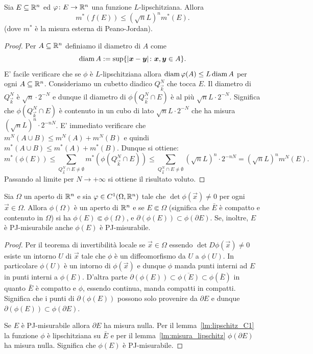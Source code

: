 \begin{lemma}
  \label{lm:misura_lipschitz}
Sia $E\subseteq {\mathbb R}^n$ ed $\varphi\colon E \to {\mathbb R}^n$ 
una funzione $L$-lipschitziana.
Allora 
\[
  m^*(f(E)) \le (\sqrt n L)^n m^*(E).
\]
(dove $m^*$ è la misura esterna di Peano-Jordan).
\end{lemma}
\begin{proof}
Per $A\subseteq {\mathbb R}^n$ definiamo il diametro di $A$ come
\[
 \operatorname{diam} A := \sup\{{\left|\boldsymbol x - \boldsymbol y\right|}\colon \boldsymbol x, \boldsymbol y \in A\}.
\]
E' facile verificare che se $\phi$ è $L$-lipschitziana allora
$\operatorname{diam} \varphi(A) \le L \operatorname{diam} A$ per ogni $A\subseteq {\mathbb R}^n$.
Consideriamo un cubetto diadico $Q^N_{\vec k}$ che tocca $E$.
Il diametro di $Q^N_{\vec k}$ è $\sqrt n \cdot 2^{-N}$ e dunque 
il diametro di $\phi(Q^N_{\vec k}\cap E)$ è al più $\sqrt n L \cdot 2^{-N}$.
Significa che $\phi(Q^N_{\vec k}\cap E)$ è contenuto 
in un cubo di lato $\sqrt n L \cdot 2^{-N}$ 
che ha misura $(\sqrt n L)^n \cdot 2^{-nN}$.
E' immediato verificare che $m^N(A\cup B)\le m^N(A) + m^N(B)$ 
e quindi $m^*(A\cup B)\le m^*(A) + m^*(B)$.
Dunque si ottiene:
\[
  m^*(\phi(E)) \le \sum_{Q^N_{\vec k}\cap E \neq \emptyset} m^*(\phi(Q^N_{\vec k}\cap E))
  \le \sum_{Q^N_{\vec k}\cap E \neq \emptyset} (\sqrt n L)^n \cdot 2^{-nN}
  = (\sqrt n L)^n m^N(E).
\]
Passando al limite per $N\to +\infty$ si ottiene il risultato voluto.
\end{proof}

\begin{lemma}
\label{lm:misurabile_C1}
Sia $\Omega$ un aperto di ${\mathbb R}^n$ e sia $\varphi\in C^1(\Omega,{\mathbb R}^n)$
tale che $\det \phi(\vec x) \neq 0$ per ogni $\vec x \in \Omega$.
Allora $\phi(\Omega)$ è un aperto di ${\mathbb R}^n$ e 
se $E\Subset \Omega$ 
(significa che $\bar E$ è compatto e contenuto in $\Omega$)
si ha $\phi(E)\Subset \phi(\Omega)$, 
e $\partial (\phi(E)) \subset \phi(\partial E)$. 
Se, inoltre, $E$ è PJ-misurabile anche $\phi(E)$ è PJ-misurabile.
\end{lemma}
%
\begin{proof}
Per il teorema di invertibilità locale 
se $\vec x \in \Omega$ essendo $\det D\phi(\vec x) \neq 0$ esiste un intorno $U$ di $\vec x$
tale che $\phi$ è un diffeomorfismo da $U$ a $\phi(U)$.
In particolare $\phi(U)$ è un intorno di $\phi(\vec x)$ 
e dunque $\phi$ manda punti interni ad $E$ 
in punti interni a $\phi(E)$.
D'altra parte $\partial(\phi(E))\subset \overline{\phi(E)} \subset \phi(\bar E)$
in quanto $\bar E$ è compatto e $\phi$, essendo continua, manda compatti in compatti.
Significa che i punti di $\partial(\phi(E))$ 
possono solo provenire da $\partial E$ 
e dunque $\partial(\phi(E)) \subset \phi(\partial E)$.

Se $E$ è PJ-misurabile allora $\partial E$ ha misura nulla.
Per il lemma~\ref{lm:lipschitz_C1} la funzione $\phi$ è lipschitziana su $\bar E$
e per il lemma~\ref{lm:misura_lipschitz} $\phi(\partial E)$ ha misura nulla.
Significa che $\phi(E)$ è PJ-misurabile.
\end{proof}

